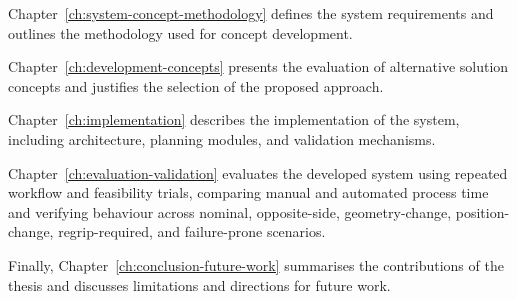 Chapter~\ref{ch:system-concept-methodology} defines the system requirements and outlines the methodology used for concept development.

Chapter~\ref{ch:development-concepts} presents the evaluation of alternative solution concepts and justifies the selection of the proposed approach.

Chapter~\ref{ch:implementation} describes the implementation of the system, including architecture, planning modules, and validation mechanisms.

Chapter~\ref{ch:evaluation-validation} evaluates the developed system using repeated workflow and feasibility trials, comparing manual and automated process time and verifying behaviour across nominal, opposite-side, geometry-change, position-change, regrip-required, and failure-prone scenarios.

Finally, Chapter~\ref{ch:conclusion-future-work} summarises the contributions of the thesis and discusses limitations and directions for future work.

